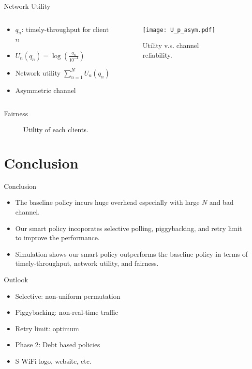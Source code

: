 \documentclass{beamer}
\begin{document}
\begin{frame}{Network Utility}
\begin{columns}
  \begin{column}{.5\textwidth}
  \begin{itemize}
    \item $q_n$: timely-throughput for client $n$
    \item $U_n(q_n) = \log (\frac{q_n}{10^{-4}})$
    \item Network utility $\sum_{n=1}^{N} U_n(q_n)$
    \item Asymmetric channel
  \end{itemize}
  \end{column}
  \begin{column}{.5\textwidth}
\begin{figure}[htbp]
  \centering
  \texttt{[image: U\_p\_asym.pdf]}
  \caption{Utility v.s. channel reliability.}
\end{figure}
  \end{column}
\end{columns}
\end{frame}

\begin{frame}{Fairness}
\begin{figure}[htbp]
  \centering
  \caption{Utility of each clients.}
\end{figure}
\end{frame}

\section*{Conclusion}
\begin{frame}{Conclusion}
  \begin{itemize}
    \item The baseline policy incurs huge overhead especially with large $N$ and bad channel.
    \item Our smart policy incoporates selective polling, piggybacking, and
      retry limit to improve the performance.
    \item Simulation shows our smart policy outperforms the baseline policy in
      terms of timely-throughput, network utility, and fairness.
  \end{itemize}
\end{frame}

\begin{frame}{Outlook}
  \begin{itemize}
    \item Selective: non-uniform permutation
    \item Piggybacking: non-real-time traffic
    \item Retry limit: optimum
    \item Phase 2: Debt based policies
    \item S-WiFi logo, website, etc.
  \end{itemize}
\end{frame}
\end{document}
